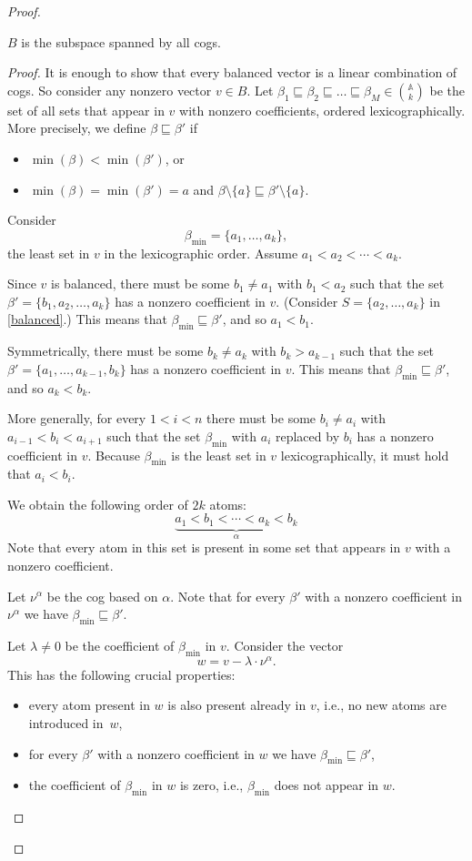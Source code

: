 \documentclass[10pt,a4paper]{amsart}
\numberwithin{equation}{section}
\newcommand{\atoms}{\mathbb A}
\begin{document}
\begin{proof}
\begin{claim}\label{clm:Bcogs}
$B$ is the subspace spanned by all cogs.
\end{claim}
\begin{proof}
It is enough to show that every balanced vector is a linear combination of cogs. So consider any nonzero vector $v\in B$. Let $\beta_1\sqsubseteq \beta_2\sqsubseteq\ldots\sqsubseteq\beta_M\in{\atoms\choose k}$ be the set of all sets that appear in $v$ with nonzero coefficients, ordered lexicographically. More precisely, we define $\beta\sqsubseteq\beta'$ if 
\begin{itemize}
\item $\min(\beta)<\min(\beta')$, or
\item $\min(\beta)=\min(\beta')=a$ and $\beta\setminus\{a\}\sqsubseteq\beta'\setminus\{a\}$.
\end{itemize}
Consider
\[
	\beta_{\textrm{min}} = \{a_1,\ldots,a_k\},
\]
the least set in $v$ in the lexicographic order. Assume $a_1<a_2<\cdots <a_k$. 

Since $v$ is balanced, there must be some $b_1\neq a_1$ with $b_1<a_2$ such that the set $\beta'=\{b_1,a_2,\ldots,a_k\}$ has a nonzero coefficient in $v$. (Consider $S=\{a_2,\ldots, a_{k}\}$ in \eqref{balanced}.) This means that $\beta_{\textrm{min}}\sqsubseteq\beta'$, and so $a_1<b_1$.

Symmetrically, there must be some $b_k\neq a_k$ with $b_k>a_{k-1}$ such that the set $\beta'=\{a_1,\ldots,a_{k-1},b_k\}$ has a nonzero coefficient in $v$. This means that $\beta_{\textrm{min}}\sqsubseteq\beta'$, and so $a_k<b_k$.

More generally, for every $1<i<n$ there must be some $b_i\neq a_i$ with $a_{i-1}<b_i<a_{i+1}$ such that the set $\beta_{\textrm{min}}$ with $a_i$ replaced by $b_i$ has a nonzero coefficient in $v$. Because $\beta_{\textrm{min}}$ is the least set in $v$ lexicographically, it must hold that $a_i<b_i$.

We obtain the following order of $2k$ atoms:
\[
	\underbrace{a_1<b_1<\cdots<a_k<b_k}_\alpha
\]
Note that every atom in this set is present in some set that appears in $v$ with a nonzero coefficient. 

Let $\nu^\alpha$ be the cog based on $\alpha$. Note that for every $\beta'$ with a nonzero coefficient in $\nu^\alpha$ we have $\beta_{\textrm{min}}\sqsubseteq \beta'$.

Let $\lambda\neq 0$ be the coefficient of $\beta_{\textrm{min}}$ in $v$.
Consider the vector
\[
	w = v-\lambda\cdot\nu^\alpha.
\]
This has the following crucial properties:
\begin{itemize}
\item every atom present in $w$ is also present already in $v$, i.e., no new atoms are introduced in~$w$,
\item for every $\beta'$ with a nonzero coefficient in $w$ we have $\beta_{\textrm{min}}\sqsubseteq \beta'$,
\item the coefficient of $\beta_{\textrm{min}}$ in $w$ is zero, i.e., $\beta_{\textrm{min}}$ does not appear in $w$.
\end{itemize}


\end{proof}
\end{proof}
\end{document}
